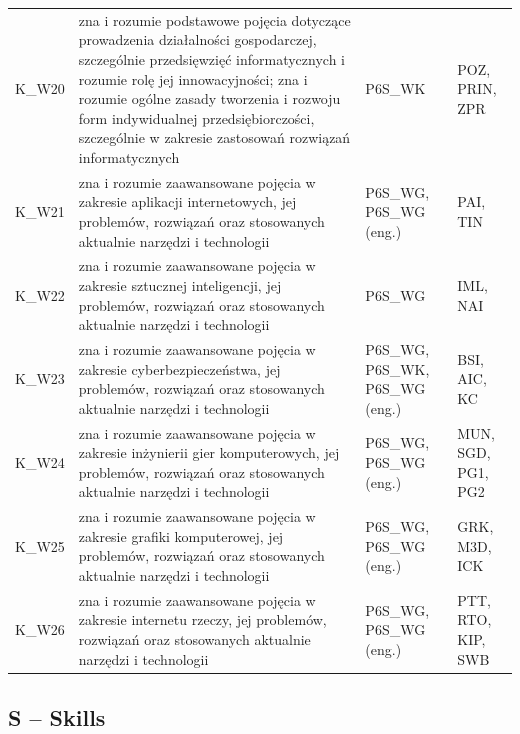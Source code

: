\documentclass[12pt,a4paper]{article}
\begin{document}
{\begin{longtable}{m{1cm}m{8.8cm}m{2.1cm}m{2.5cm}}
\rowcolor{tableRowAlt} K\_W20 & zna i rozumie podstawowe pojęcia dotyczące prowadzenia działalności gospodarczej, szczególnie przedsięwzięć informatycznych i rozumie rolę jej innowacyjności; zna i rozumie ogólne zasady tworzenia i rozwoju form indywidualnej przedsiębiorczości, szczególnie w zakresie zastosowań rozwiązań informatycznych & {\scriptsize P6S\_WK} & {\scriptsize POZ, PRIN, ZPR} \\
\rowcolor{tableRowLight} K\_W21 & zna i rozumie zaawansowane pojęcia w zakresie aplikacji internetowych, jej problemów, rozwiązań oraz stosowanych aktualnie narzędzi i technologii & {\scriptsize P6S\_WG, P6S\_WG {\scriptsize (eng.)}} & {\scriptsize PAI, TIN} \\
\rowcolor{tableRowAlt} K\_W22 & zna i rozumie zaawansowane pojęcia w zakresie sztucznej inteligencji, jej problemów, rozwiązań oraz stosowanych aktualnie narzędzi i technologii & {\scriptsize P6S\_WG} & {\scriptsize IML, NAI} \\
\rowcolor{tableRowLight} K\_W23 & zna i rozumie zaawansowane pojęcia w zakresie cyberbezpieczeństwa, jej problemów, rozwiązań oraz stosowanych aktualnie narzędzi i technologii & {\scriptsize P6S\_WG, P6S\_WK, P6S\_WG {\scriptsize (eng.)}} & {\scriptsize BSI, AIC, KC} \\
\rowcolor{tableRowAlt} K\_W24 & zna i rozumie zaawansowane pojęcia w zakresie inżynierii gier komputerowych, jej problemów, rozwiązań oraz stosowanych aktualnie narzędzi i technologii & {\scriptsize P6S\_WG, P6S\_WG {\scriptsize (eng.)}} & {\scriptsize MUN, SGD, PG1, PG2} \\
\rowcolor{tableRowLight} K\_W25 & zna i rozumie zaawansowane pojęcia w zakresie grafiki komputerowej, jej problemów, rozwiązań oraz stosowanych aktualnie narzędzi i technologii & {\scriptsize P6S\_WG, P6S\_WG {\scriptsize (eng.)}} & {\scriptsize GRK, M3D, ICK} \\
\rowcolor{tableRowAlt} K\_W26 & zna i rozumie zaawansowane pojęcia w zakresie internetu rzeczy, jej problemów, rozwiązań oraz stosowanych aktualnie narzędzi i technologii & {\scriptsize P6S\_WG, P6S\_WG {\scriptsize (eng.)}} & {\scriptsize PTT, RTO, KIP, SWB} \\
\bottomrule
\end{longtable}}

\subsection*{S -- Skills}
\end{document}
